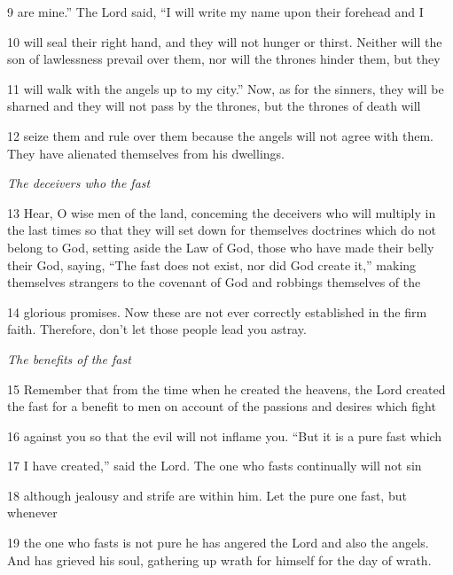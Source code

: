 \par 9 are mine.” The Lord said, “I will write my name upon their forehead and I

\par 10 will seal their right hand, and they will not hunger or thirst. Neither will the son of lawlessness prevail over them, nor will the thrones hinder them, but they

\par 11 will walk with the angels up to my city.” Now, as for the sinners, they will be sharned and they will not pass by the thrones, but the thrones of death will

\par 12 seize them and rule over them because the angels will not agree with them. They have alienated themselves from his dwellings.

\par \textit{The deceivers who the fast}

\par 13 Hear, O wise men of the land, conceming the deceivers who will multiply in the last times so that they will set down for themselves doctrines which do not belong to God, setting aside the Law of God, those who have made their belly their God, saying, “The fast does not exist, nor did God create it,” making themselves strangers to the covenant of God and robbings themselves of the

\par 14 glorious promises. Now these are not ever correctly established in the firm faith. Therefore, don't let those people lead you astray.

\par \textit{The benefits of the fast}

\par 15 Remember that from the time when he created the heavens, the Lord created the fast for a benefit to men on account of the passions and desires which fight

\par 16 against you so that the evil will not inflame you. “But it is a pure fast which

\par 17 I have created,” said the Lord. The one who fasts continually will not sin

\par 18 although jealousy and strife are within him. Let the pure one fast, but whenever

\par 19 the one who fasts is not pure he has angered the Lord and also the angels. And has grieved his soul, gathering up wrath for himself for the day of wrath.

